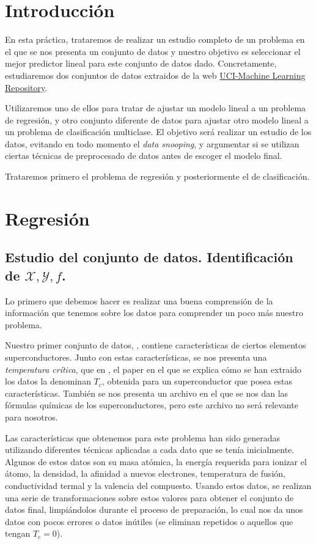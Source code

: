 \documentclass[a4paper, 20pt]{article}
\begin{document}
\section*{Introducción}

En esta práctica, trataremos de realizar un estudio completo de un problema en el que se nos
presenta un conjunto de datos y nuestro objetivo es seleccionar el mejor predictor lineal para
este conjunto de datos dado. Concretamente, estudiaremos dos conjuntos de datos extraidos
de la web \href{https://archive.ics.uci.edu/ml/index.php}{UCI-Machine Learning Repository}.

Utilizaremos uno de ellos para tratar de ajustar un modelo lineal a un problema de regresión, y otro conjunto diferente de datos para ajustar otro modelo lineal a un problema de clasificación multiclase. El objetivo será realizar un estudio de los datos, evitando en todo momento el \emph{data snooping}, y argumentar si se utilizan ciertas técnicas de preprocesado de datos antes de escoger el modelo final.

Trataremos primero el problema de regresión y posteriormente el de clasificación.

\section{Regresión}

\subsection{Estudio del conjunto de datos. Identificación de $\mathcal X,\mathcal Y,f$.}

Lo primero que debemos hacer es realizar una buena comprensión de la información que tenemos sobre los datos para comprender un poco más nuestro problema.

Nuestro primer conjunto de datos, \cite{superdata}, contiene características de ciertos elementos superconductores. Junto con estas características, se nos presenta una \emph{temperatura crítica}, que en \cite{hamidieh}, el paper en el que se explica cómo se han extraido los datos la denominan $T_c$, obtenida para un superconductor que posea estas características. También se nos presenta un archivo en el que se nos dan las fórmulas químicas de los superconductores, pero este archivo no será relevante para nosotros.

Las características que obtenemos para este problema han sido generadas utilizando diferentes técnicas aplicadas a cada dato que se tenía inicialmente. Algunos de estos datos son su masa atómica, la energía requerida para ionizar el átomo, la densidad, la afinidad a nuevos electrones, temperatura de fusión, conductividad termal y la valencia del compuesto. Usando estos datos, se realizan una serie de transformaciones sobre estos valores para obtener el conjunto de datos final, limpiándolos durante el proceso de preparación, lo cual nos da unos datos con pocos errores o datos inútiles (se eliminan repetidos o aquellos que tengan $T_c = 0$).
\end{document}
